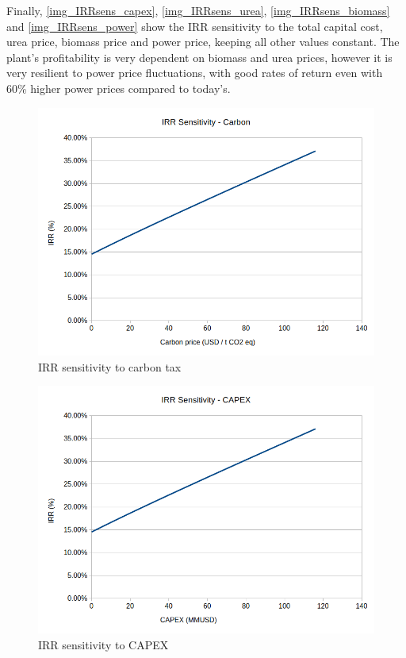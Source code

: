 \documentclass[a4paper, titlepage]{article}
\begin{document}
Finally, \autoref{img_IRRsens_capex}, \autoref{img_IRRsens_urea}, \autoref{img_IRRsens_biomass} and
\autoref{img_IRRsens_power} show the IRR sensitivity to the total capital cost, urea price,
biomass price and power price, keeping all other values constant. The plant's profitability is very dependent on
biomass and urea prices, however it is very resilient to power price fluctuations, with good rates of return
even with 60\% higher power prices compared to today's.


\begin{figure}
	\includegraphics[width=\textwidth]{img/fig_IRRsensitivity_carbon.png}
	\caption{IRR sensitivity to carbon tax}
	\label{img_IRRsens_carbon}
\end{figure}

\begin{figure}
	\includegraphics[width=\textwidth]{img/fig_IRRsensitivity_capex.png}
	\caption{IRR sensitivity to CAPEX}
	\label{img_IRRsens_capex}
\end{figure}
\end{document}
